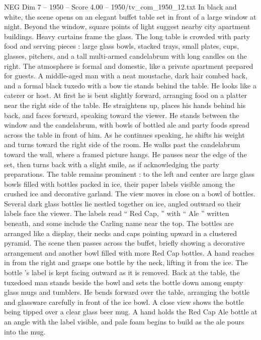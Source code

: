 \begin{textsample}{NEG Dim 7 – 1950 – Score 4.00 – 1950/tv\_com\_1950\_12.txt}  \label{ex:f7_neg_087}
In black and white, the scene opens on an elegant buffet table set in front of a large window at night.
Beyond the window, square points of light suggest nearby city apartment buildings.
Heavy curtains frame the glass.
The long table is crowded with party food and serving pieces : large glass bowls, stacked trays, small plates, cups, glasses, pitchers, and a tall multi-armed candelabrum with long candles on the right.
The atmosphere is formal and domestic, like a private apartment prepared for guests.
A middle-aged man with a neat moustache, dark hair combed back, and a formal black tuxedo with a bow tie stands behind the table.
He looks like a caterer or host.
At first he is bent slightly forward, arranging food on a platter near the right side of the table.
He straightens up, places his hands behind his back, and faces forward, speaking toward the viewer.
He stands between the window and the candelabrum, with bowls of bottled ale and party foods spread across the table in front of him.
As he continues speaking, he shifts his weight and turns toward the right side of the room.
He walks past the candelabrum toward the wall, where a framed picture hangs.
He pauses near the edge of the set, then turns back with a slight smile, as if acknowledging the party preparations.
The table remains prominent : to the left and center are large glass bowls filled with bottles packed in ice, their paper labels visible among the crushed ice and decorative garland.
The view moves in close on a bowl of bottles.
Several dark glass bottles lie nestled together on ice, angled outward so their labels face the viewer.
The labels read “ Red Cap, ” with “ Ale ” written beneath, and some include the Carling name near the top.
The bottles are arranged like a display, their necks and caps pointing upward in a clustered pyramid.
The scene then passes across the buffet, briefly showing a decorative arrangement and another bowl filled with more Red Cap bottles.
A hand reaches in from the right and grasps one bottle by the neck, lifting it from the ice.
The bottle ’s label is kept facing outward as it is removed.
Back at the table, the tuxedoed man stands beside the bowl and sets the bottle down among empty glass mugs and tumblers.
He bends forward over the table, arranging the bottle and glassware carefully in front of the ice bowl.
A close view shows the bottle being tipped over a clear glass beer mug.
A hand holds the Red Cap Ale bottle at an angle with the label visible, and pale foam begins to build as the ale pours into the mug.

\end{textsample}
